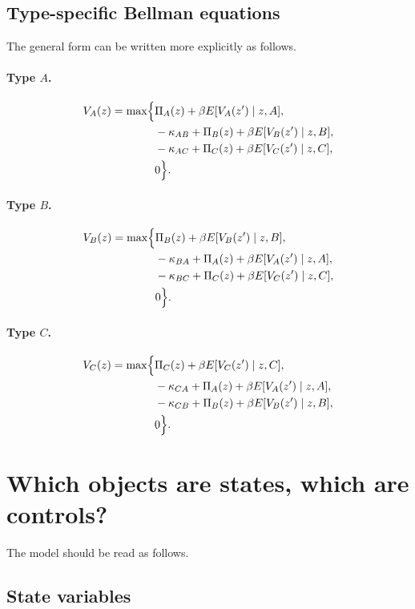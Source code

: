 \documentclass[12pt]{article}
\begin{document}
\subsection{Type-specific Bellman equations}

The general form can be written more explicitly as follows.

\paragraph{Type $A$.}
\[
\begin{aligned}
V_A(z)
=
\max\Bigl\{&
\Pi_A(z)+\beta E[V_A(z')\mid z,A],\\
&-\kappa_{AB}+\Pi_B(z)+\beta E[V_B(z')\mid z,B],\\
&-\kappa_{AC}+\Pi_C(z)+\beta E[V_C(z')\mid z,C],\\
&0
\Bigr\}.
\end{aligned}
\]

\paragraph{Type $B$.}
\[
\begin{aligned}
V_B(z)
=
\max\Bigl\{&
\Pi_B(z)+\beta E[V_B(z')\mid z,B],\\
&-\kappa_{BA}+\Pi_A(z)+\beta E[V_A(z')\mid z,A],\\
&-\kappa_{BC}+\Pi_C(z)+\beta E[V_C(z')\mid z,C],\\
&0
\Bigr\}.
\end{aligned}
\]

\paragraph{Type $C$.}
\[
\begin{aligned}
V_C(z)
=
\max\Bigl\{&
\Pi_C(z)+\beta E[V_C(z')\mid z,C],\\
&-\kappa_{CA}+\Pi_A(z)+\beta E[V_A(z')\mid z,A],\\
&-\kappa_{CB}+\Pi_B(z)+\beta E[V_B(z')\mid z,B],\\
&0
\Bigr\}.
\end{aligned}
\]

\section{Which objects are states, which are controls?}

The model should be read as follows.

\subsection{State variables}
\end{document}
